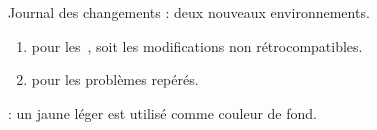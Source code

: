 \begin{tdocnew}
    \item Journal des changements : deux nouveaux environnements.
    \begin{enumerate}
        \item {} pour les \,, soit les modifications non rétrocompatibles.

        \item {} pour les problèmes repérés.
    \end{enumerate}

    \item {}: un jaune léger est utilisé comme couleur de fond.
\end{tdocnew}
